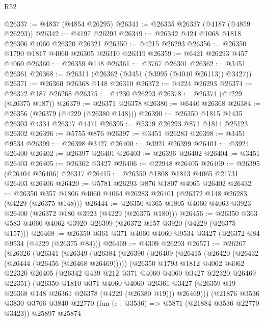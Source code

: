 \begin{lexlean}{R52}
\begin{coremodule}
@26337 := @4837 (@4854 @26295)
@26341 := @26335 @26337 (@4187 (@4859 @26293))
@26342 := @4197 @26293
@26349 := @26342 @424 @1068 @1818 @26306 @4060 @26320 @26321
@26350 := @4215 @26293
@26356 := @26350 @1790 @1817 @4060 @26305 @26310 @26319
@26359 := @6421 @26293 @457 @4060
@26360 := @26359 @148
@26361 := @3767 @26301
@26362 := @3451 @26361
@26368 := @26311 (@26362 (@3451 (@3995 (@4040 @26113)) @3427))
@26371 := @26360 @26368 @148 @26310
@26372 := @4224 @26293
@26374 := @26372 @187 @26268
@26375 := @4230 @26293
@26378 := @26374 (@4229 (@26375 @187))
@26379 := @26371 @26378
@26380 := @6440 @26368
@26384 := @26356 (@26379 (@4229 (@26380 @148)))
@26390 := @26350 @1815 @1435 @26303 @4334 @26317 @4471
@26395 := @5319 @26293 @871 @1814 @25123 @26302
@26396 := @5755 @876
@26397 := @3451 @26283
@26398 := @3451 @9534
@26399 := @26398 @3427
@26400 := @3921 @26399
@26401 := @3924 @26400
@26402 := @26397 @26401
@26403 := @26396 @26402
@26404 := @3451 @26403
@26405 := @26362 @3427
@26406 := @22948 @26405
@26409 := @26395 (@26404 @26406) @26317
@26415 := @26350 @1808 @1813 @4065 @21731 @26403 @26406
@26420 := @5781 @26293 @876 @1807 @4065 @26402
@26432 := @26350 @357 @1806 @4060 @4064 @26283 @26401 (@26372 @148 @26283 (@4229 (@26375 @148)))
@26444 := @26350 @365 @1805 @4060 @4063 @3923 @26400 (@26372 @180 @3923 (@4229 (@26375 @180)))
@26456 := @26350 @363 @583 @4060 @4062 @3920 @26399 (@26372 @157 @3920 (@4229 (@26375 @157)))
@26468 := @26350 @361 @371 @4060 @4060 @9534 @3427 (@26372 @84 @9534 (@4229 (@26375 @84)))
@26469 := @4309 @26293
@26571 := @26267
    (@26326
      (@26341
        (@26349
          (@26384
            (@26390
              (@26409
                (@26415
                  (@26420 (@26432 (@26444 (@26456 (@26468 @26469)))))
                  (@26350
                    @1793
                    @1812
                    @4062
                    @4062
                    @22320
                    @26405
                    (@26342 @439 @212 @371 @4060 @4060 @3427 @22320 @26469 @22351)
                    (@26350
                      @1810
                      @371
                      @4060
                      @4060
                      @26361
                      @3427
                      (@26359 @19 @26368 @148 @26361 @26378 (@4229 (@26380 @19)))
                      @26469)))
                (@21876
                  @3536
                  @3830
                  @3766
                  @3840
                  @22770
                  (fun (e : @3536) => @5871 (@21884 @3536 @22770 @3423))
                  @25897
                  @25874

\end{coremodule}
\end{lexlean}
